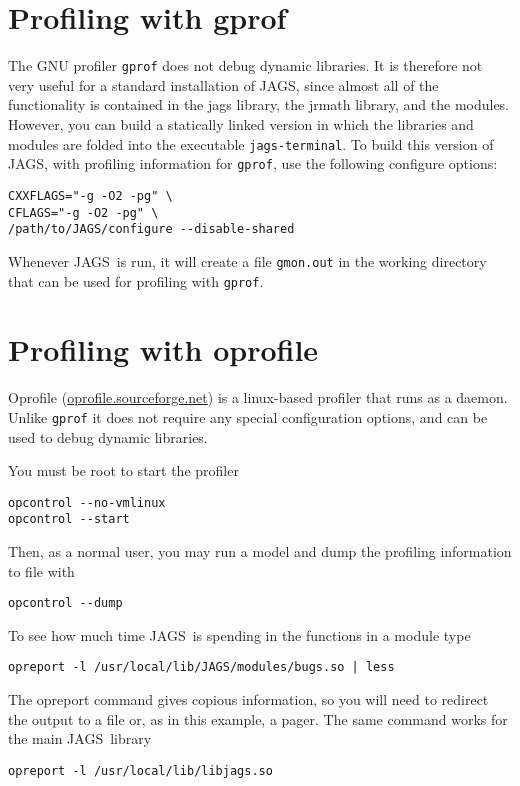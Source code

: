 \documentclass[11pt, a4paper, titlepage]{report}
\newcommand{\JAGS}{\textsf{JAGS}}
\begin{document}
\section{Profiling with gprof}

The GNU profiler \texttt{gprof} does not debug dynamic libraries. It
is therefore not very useful for a standard installation of \JAGS,
since almost all of the functionality is contained in the jags
library, the jrmath library, and the modules.  However, you can build
a statically linked version in which the libraries and modules are
folded into the executable \texttt{jags-terminal}. To build this
version of \JAGS, with profiling information for \texttt{gprof}, use
the following configure options:
\begin{verbatim}
CXXFLAGS="-g -O2 -pg" \
CFLAGS="-g -O2 -pg" \
/path/to/JAGS/configure --disable-shared
\end{verbatim}
Whenever \JAGS\ is run, it will create a file \texttt{gmon.out} in
the working directory that can be used for profiling with \texttt{gprof}.

\section{Profiling with oprofile}

Oprofile (\url{oprofile.sourceforge.net}) is a linux-based profiler
that runs as a daemon. Unlike \texttt{gprof} it does not require any
special configuration options, and can be used to debug dynamic libraries.

You must be root to start the profiler
\begin{verbatim}
opcontrol --no-vmlinux
opcontrol --start
\end{verbatim}
Then, as a normal user, you may run a model and dump the profiling
information to file with
\begin{verbatim}
opcontrol --dump
\end{verbatim}

To see how much time \JAGS\ is spending in the functions in a module
type
\begin{verbatim}
opreport -l /usr/local/lib/JAGS/modules/bugs.so | less
\end{verbatim}
The opreport command gives copious information, so you will need to
redirect the output to a file or, as in this example, a pager.
The same command works for the main \JAGS\ library
\begin{verbatim}
opreport -l /usr/local/lib/libjags.so
\end{verbatim}
\end{document}
